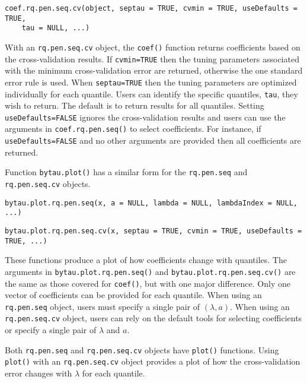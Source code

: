 \begin{verbatim}
coef.rq.pen.seq.cv(object, septau = TRUE, cvmin = TRUE, useDefaults = TRUE,
    tau = NULL, ...)
\end{verbatim}

With an \texttt{rq.pen.seq.cv} object, the \texttt{coef()} function returns coefficients based on the cross-validation results. If \texttt{cvmin=TRUE} then the tuning parameters associated with the minimum cross-validation error are returned, otherwise the one standard error rule is used. When \texttt{septau=TRUE} then the tuning parameters are optimized individually for each quantile. Users can identify the specific quantiles, \texttt{tau}, they wish to return. The default is to return results for all quantiles. Setting \texttt{useDefaults=FALSE} ignores the cross-validation results and users can use the arguments in \texttt{coef.rq.pen.seq()} to select coefficients. For instance, if \texttt{useDefaults=FALSE} and no other arguments are provided then all coefficients are returned.

Function \texttt{bytau.plot()} has a similar form for the \texttt{rq.pen.seq} and \texttt{rq.pen.seq.cv} objects. \newline

\begin{verbatim}
bytau.plot.rq.pen.seq(x, a = NULL, lambda = NULL, lambdaIndex = NULL, ...)
\end{verbatim}

\begin{verbatim}
bytau.plot.rq.pen.seq.cv(x, septau = TRUE, cvmin = TRUE, useDefaults = TRUE, ...)
\end{verbatim}

These functions produce a plot of how coefficients change with quantiles. The arguments in \texttt{bytau.plot.rq.pen.seq()} and \texttt{bytau.plot.rq.pen.seq.cv()} are the same as those covered for \texttt{coef()}, but with one major difference. Only one vector of coefficients can be provided for each quantile. When using an \texttt{rq.pen.seq} object, users must specify a single pair of \((\lambda,a)\). When using an \texttt{rq.pen.seq.cv} object, users can rely on the default tools for selecting coefficients or specify a single pair of \(\lambda\) and \(a\).

Both \texttt{rq.pen.seq} and \texttt{rq.pen.seq.cv} objects have \texttt{plot()} functions. Using \texttt{plot()} with an \texttt{rq.pen.seq.cv} object provides a plot of how the cross-validation error changes with \(\lambda\) for each quantile.

